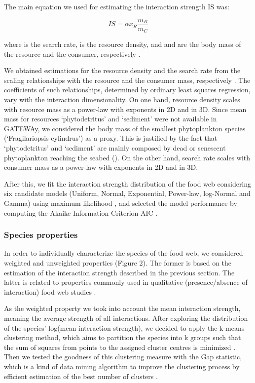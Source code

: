 \documentclass[gc, manuscript]{copernicus}
\begin{document}
The main equation we used for estimating the interaction strength IS
was:

\begin{equation}
IS = \alpha x_R \frac{m_R}{m_C}
\end{equation}

where \vec{\alpha} is the search rate,  is the resource
density, and  and  are the body mass of the resource
and the consumer, respectively \citep{Pawar2012}.

We obtained estimations for the resource density and the search rate
from the scaling relationships with the resource and the consumer mass,
respectively \citep{Pawar2012}. The coefficients of such relationships,
determined by ordinary least squares regression, vary with the
interaction dimensionality. On one hand, resource density scales with
resource mass as a power-law with exponents  in
2D and  in 3D. Since mean mass for resources
`phytodetritus' and `sediment' were not available in GATEWAy, we
considered the body mass of the smallest phytoplankton species
(`Fragilariopsis cylindrus') as a proxy. This is justified by the fact
that `phytodetritus' and `sediment' are mainly composed by dead or
senescent phytoplankton reaching the seabed (\citet{Wolanski2011}). On
the other hand, search rate scales with consumer mass as a power-law
with exponents  in 2D and 
in 3D.

After this, we fit the interaction strength distribution of the food web
considering six candidate models (Uniform, Normal, Exponential,
Power-law, log-Normal and Gamma) using maximum likelihood
\citep{McCallum2008}, and selected the model performance by computing
the Akaike Information Criterion AIC \citep{Burnham2002}.

\subsubsection{Species properties}

In order to individually characterize the species of the food web, we
considered weighted and unweighted properties (Figure 2). The former is
based on the estimation of the interaction strength described in the
previous section. The latter is related to properties commonly used in
qualitative (presence/absence of interaction) food web studies
\citep{Martinez1991, Dunne2002, Borrelli2014}.

As the weighted property we took into account the mean interaction
strength, meaning the average strength of all interactions. After
exploring the distribution of the species' log(mean interaction
strength), we decided to apply the k-means clustering method, which aims
to partition the species into k groups such that the sum of squares from
points to the assigned cluster centres is minimized
\citep{Hartigan1979}. Then we tested the goodness of this clustering
measure with the Gap statistic, which is a kind of data mining algorithm
to improve the clustering process by efficient estimation of the best
number of clusters \citep{Tibshirani2001}.
\end{document}
